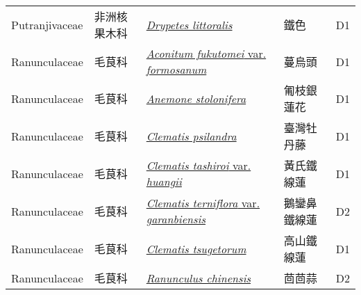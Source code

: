 {\begin{longtable}{L{2.5cm}L{2cm}L{5cm}L{2.5cm}L{3cm}}
    Putranjivaceae & 非洲核果木科 & \href{http://www.theplantlist.org/tpl1.1/search?q=Drypetes+littoralis}{\textit{Drypetes littoralis} } & 鐵色 & D1    \\
    Ranunculaceae & 毛茛科 & \href{http://www.theplantlist.org/tpl1.1/search?q=Aconitum+fukutomei+var.+formosanum}{\textit{Aconitum fukutomei} var. \textit{formosanum} } & 蔓烏頭 & D1    \\
    Ranunculaceae & 毛茛科 & \href{http://www.theplantlist.org/tpl1.1/search?q=Anemone+stolonifera}{\textit{Anemone stolonifera} } & 匍枝銀蓮花 & D1    \\
    Ranunculaceae & 毛茛科 & \href{http://www.theplantlist.org/tpl1.1/search?q=Clematis+psilandra}{\textit{Clematis psilandra} } & 臺灣牡丹藤 & D1    \\
    Ranunculaceae & 毛茛科 & \href{http://www.theplantlist.org/tpl1.1/search?q=Clematis+tashiroi+var.+huangii}{\textit{Clematis tashiroi} var. \textit{huangii} } & 黃氏鐵線蓮 & D1    \\
    Ranunculaceae & 毛茛科 & \href{http://www.theplantlist.org/tpl1.1/search?q=Clematis+terniflora+var.+garanbiensis}{\textit{Clematis terniflora} var. \textit{garanbiensis} } & 鵝鑾鼻鐵線蓮 & D2    \\
    Ranunculaceae & 毛茛科 & \href{http://www.theplantlist.org/tpl1.1/search?q=Clematis+tsugetorum}{\textit{Clematis tsugetorum} } & 高山鐵線蓮 & D1    \\
    Ranunculaceae & 毛茛科 & \href{http://www.theplantlist.org/tpl1.1/search?q=Ranunculus+chinensis}{\textit{Ranunculus chinensis} } & 茴茴蒜 & D2    \\

\end{longtable}}
